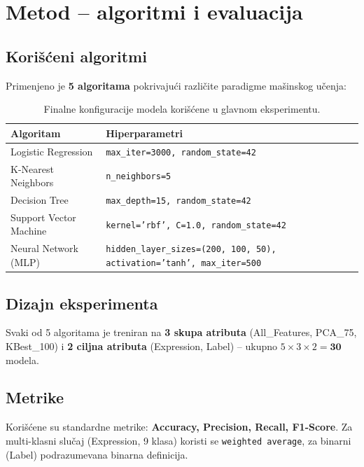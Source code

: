 \documentclass[12pt,a4paper]{article}
\begin{document}
\section{Metod -- algoritmi i evaluacija}

\subsection{Korišćeni algoritmi}

Primenjeno je \textbf{5 algoritama} pokrivajući različite paradigme mašinskog učenja:

\begin{table}[H]
\centering
\begin{tabular}{lp{9cm}}
\toprule
\textbf{Algoritam} & \textbf{Hiperparametri} \\
\midrule
Logistic Regression & \texttt{max\_iter=3000, random\_state=42} \\
K-Nearest Neighbors & \texttt{n\_neighbors=5} \\
Decision Tree & \texttt{max\_depth=15, random\_state=42} \\
Support Vector Machine & \texttt{kernel='rbf', C=1.0, random\_state=42} \\
Neural Network (MLP) & \texttt{hidden\_layer\_sizes=(200, 100, 50), activation='tanh', max\_iter=500} \\
\bottomrule
\end{tabular}
\caption{Finalne konfiguracije modela korišćene u glavnom eksperimentu.}
\end{table}

\subsection{Dizajn eksperimenta}

Svaki od 5 algoritama je treniran na \textbf{3 skupa atributa} (All\_Features, PCA\_75, KBest\_100) i \textbf{2 ciljna atributa} (Expression, Label) -- ukupno $5 \times 3 \times 2 = \mathbf{30}$ modela.

\subsection{Metrike}

Korišćene su standardne metrike: \textbf{Accuracy, Precision, Recall, F1-Score}. Za multi-klasni slučaj (Expression, 9 klasa) koristi se \texttt{weighted average}, za binarni (Label) podrazumevana binarna definicija.
\end{document}
